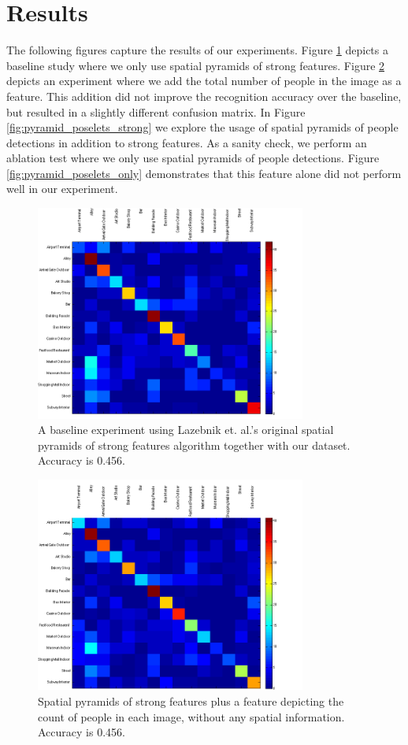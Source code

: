 \documentclass[11pt]{article}
\begin{document}
\section{Results}

The following figures capture the results of our experiments. Figure \ref{fig:strong} depicts a baseline study where we only use spatial pyramids of strong features. Figure \ref{fig:poselets_strong} depicts an experiment where we add the total number of people in the image as a feature. This addition did not improve the recognition accuracy over the baseline, but resulted in a slightly different confusion matrix. In Figure \ref{fig:pyramid_poselets_strong} we explore the usage of spatial pyramids of people detections in addition to strong features. As a sanity check, we perform an ablation test where we only use spatial pyramids of people detections. Figure \ref{fig:pyramid_poselets_only} demonstrates that this feature alone did not perform well in our experiment.

\begin{figure}[p]
 \centering
\includegraphics[width=3.5in]{images/Strong_features.png}
 \caption{A baseline experiment using Lazebnik et. al.'s original spatial pyramids of strong features algorithm together with our dataset. Accuracy is 0.456.}
 \label{fig:strong}
\end{figure}

\begin{figure}[p]
 \centering
\includegraphics[width=3.5in]{images/Poselets_and_strong_features.png}
 \caption{Spatial pyramids of strong features plus a feature depicting the count of people in each image, without any spatial information. Accuracy is 0.456.}
 \label{fig:poselets_strong}
\end{figure}
\end{document}
